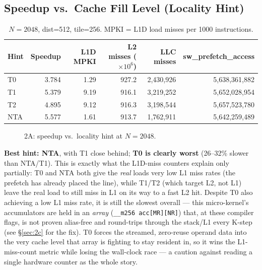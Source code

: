 \documentclass[11pt]{article}
\begin{document}
\subsection{Speedup vs.\ Cache Fill Level (Locality Hint)}

\begin{table}[h]
\centering
\begin{tabular}{l r r r r r}
\toprule
Hint & {Speedup} & {L1D MPKI} & {L2 misses ($\times10^6$)} & {LLC misses} & {sw\_prefetch\_access} \\
\midrule
T0  & 3.784 & 1.29 & 927.2 & 2{,}430{,}926 & 5{,}638{,}361{,}882 \\
T1  & 5.379 & 9.19 & 916.1 & 3{,}219{,}252 & 5{,}652{,}028{,}954 \\
T2  & 4.895 & 9.12 & 916.3 & 3{,}198{,}544 & 5{,}657{,}523{,}780 \\
NTA & 5.577 & 1.61 & 913.7 & 1{,}762{,}911 & 5{,}642{,}259{,}489 \\
\bottomrule
\end{tabular}
\caption{$N{=}2048$, dist=512, tile=256. MPKI = L1D load misses per 1000 instructions.}
\end{table}

\begin{figure}[h]
\centering
{}
\caption{2A: speedup vs.\ locality hint at $N{=}2048$.}
\end{figure}

\textbf{Best hint: NTA}, with T1 close behind; \textbf{T0 is clearly worst} (26--32\%
slower than NTA/T1). This is exactly what the L1D-miss counters explain only partially:
T0 and NTA both give the \emph{real} loads very low L1 miss rates (the prefetch has
already placed the line), while T1/T2 (which target L2, not L1) leave the real load to
still miss in L1 on its way to a fast L2 hit. Despite T0 also achieving a low L1 miss
rate, it is still the slowest overall --- this micro-kernel's accumulators are held in an
\emph{array} (\texttt{\_\_m256 acc[MR][NR]}) that, at these compiler flags, is not proven
alias-free and round-trips through the stack/L1 every K-step (see \S\ref{sec:2c} for the
fix). T0 forces the streamed, zero-reuse operand data into the very cache level that
array is fighting to stay resident in, so it wins the L1-miss-count metric while losing
the wall-clock race --- a caution against reading a single hardware counter as the whole
story.
\end{document}
